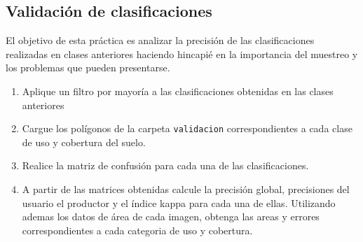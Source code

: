 \documentclass[hidelinks,12pt]{article}
\begin{document}
\subsection{Validación de clasificaciones}
El objetivo de esta práctica es analizar la precisión de las clasificaciones
realizadas en clases anteriores haciendo hincapié en la importancia del muestreo
y los problemas que pueden presentarse.

\begin{enumerate}
    \item Aplique un filtro por mayoría a las clasificaciones obtenidas en las
        clases anteriores
    \item Cargue los polígonos de la carpeta \texttt{validacion} correspondientes a
        cada clase de uso y cobertura del suelo.
    \item Realice la matriz de confusión para cada una de las clasificaciones.
    \item A partir de las matrices obtenidas calcule la precisión global,
        precisiones del usuario el productor y el índice kappa para cada una de
        ellas. Utilizando ademas los datos de \'area de cada imagen, obtenga las
        areas y errores correspondientes a cada categoria de uso y cobertura.
\end{enumerate}
\newpage
\appendix
\end{document}
